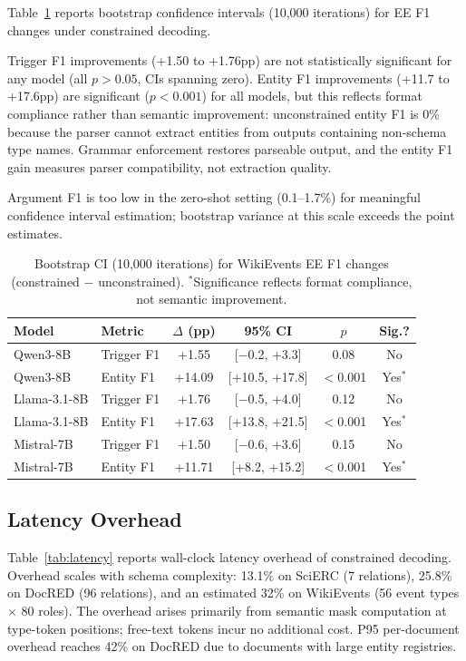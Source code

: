 \documentclass[11pt,a4paper]{article}
\begin{document}
Table~\ref{tab:bootstrap-ci} reports bootstrap confidence intervals (10,000 iterations) for EE F1 changes under constrained decoding.

Trigger F1 improvements (+1.50 to +1.76pp) are not statistically significant for any model (all $p > 0.05$, CIs spanning zero). Entity F1 improvements (+11.7 to +17.6pp) are significant ($p < 0.001$) for all models, but this reflects format compliance rather than semantic improvement: unconstrained entity F1 is 0\% because the parser cannot extract entities from outputs containing non-schema type names. Grammar enforcement restores parseable output, and the entity F1 gain measures parser compatibility, not extraction quality.

Argument F1 is too low in the zero-shot setting (0.1--1.7\%) for meaningful confidence interval estimation; bootstrap variance at this scale exceeds the point estimates.

\begin{table}[t]
\centering
\caption{Bootstrap CI (10,000 iterations) for WikiEvents EE F1 changes (constrained $-$ unconstrained). $^*$Significance reflects format compliance, not semantic improvement.}
\label{tab:bootstrap-ci}
\small
\begin{tabular}{llcccc}
\toprule
Model & Metric & $\Delta$ (pp) & 95\% CI & $p$ & Sig.? \\
\midrule
Qwen3-8B & Trigger F1 & +1.55 & [$-$0.2, +3.3] & 0.08 & No \\
Qwen3-8B & Entity F1 & +14.09 & [+10.5, +17.8] & $<$0.001 & Yes$^*$ \\
Llama-3.1-8B & Trigger F1 & +1.76 & [$-$0.5, +4.0] & 0.12 & No \\
Llama-3.1-8B & Entity F1 & +17.63 & [+13.8, +21.5] & $<$0.001 & Yes$^*$ \\
Mistral-7B & Trigger F1 & +1.50 & [$-$0.6, +3.6] & 0.15 & No \\
Mistral-7B & Entity F1 & +11.71 & [+8.2, +15.2] & $<$0.001 & Yes$^*$ \\
\bottomrule
\end{tabular}
\end{table}

\subsection{Latency Overhead}

Table~\ref{tab:latency} reports wall-clock latency overhead of constrained decoding. Overhead scales with schema complexity: 13.1\% on SciERC (7 relations), 25.8\% on DocRED (96 relations), and an estimated 32\% on WikiEvents (56 event types $\times$ 80 roles). The overhead arises primarily from semantic mask computation at type-token positions; free-text tokens incur no additional cost. P95 per-document overhead reaches 42\% on DocRED due to documents with large entity registries.
\end{document}
